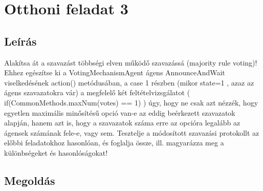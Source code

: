 \section{Otthoni feladat 3}
\subsection{Leírás}
Alakítsa át a szavazást többségi elven működő szavazássá (majority rule voting)!
Ehhez  egészítse  ki  a  VotingMechanismAgent ágens  AnnounceAndWait
viselkedésének  action() metódusában, a  case 1 részben (mikor  state=1 , azaz az
ágens  szavazatokra  vár)  a  megfelelő  két  feltételvizsgálatot
( if(CommonMethods.maxNum(votes) == 1) ) úgy, hogy ne csak azt nézzék, hogy
egyetlen maximális minősítésű opció van-e az eddig beérkezett szavazatok alapján,
hanem azt is, hogy a szavazatok száma erre az opcióra legalább az ágensek számának
fele-e, vagy sem. Tesztelje a módosított szavazási protokollt az előbbi feladatokhoz
hasonlóan, és foglalja össze, ill. magyarázza meg a különbségeket és hasonlóságokat!
\subsection{Megoldás}


